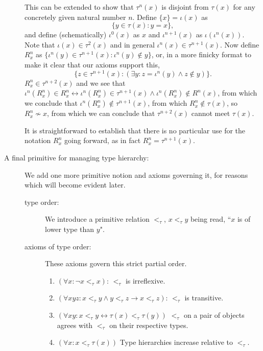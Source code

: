\documentclass[12pt]{article}
\begin{document}
\begin{description}
This can be extended to show that $\tau^n(x)$ is disjoint from $\tau(x)$ for any concretely given natural number $n$.
Define $\{x\} = \iota(x)$ as $$\{y \in \tau(x):y=x\},$$ and define (schematically) $\iota^0(x)$ as $x$ and $\iota^{n+1}(x)$ as $\iota(\iota^n(x))$.  Note that $\iota(x) \in \tau^2(x)$ and in general $\iota^n(x) \in \tau^{n+1}(x)$.  Now define $R^n_x$ as $\{\iota^n(y) \in \tau^{n+1}(x):\iota^n(y) \not\in y\}$, or, in a more finicky format to make it clear that our axioms support this,  $$\{z\in \tau^{n+1}(x):(\exists y: z=\iota^n(y)\wedge z \not\in y)\}.$$ $R^n_x \in \tau^{n+2}(x)$
and we see that $\iota^n(R^n_x) \in R^n_x \leftrightarrow \iota^n(R^n_x) \in \tau^{n+1}(x) \wedge \iota^n(R^n_x) \not\in R^n(x)$, from which we conclude that $\iota^n(R^n_x) \not\in \tau^{n+1}(x)$, from which $R^n_x \not\in \tau(x)$, so $R^n_x \not\sim x$, from which we can conclude that $\tau^{n+2}(x)$ cannot meet $\tau(x)$.

It is straightforward to establish that there is no particular use for the notation $R^n_x$ going forward, as in fact $R^n_x = \tau^{n+1}(x)$.


\item[A final primitive for managing type hierarchy:]  We add one more primitive notion and axioms governing it, for reasons which will become evident later.

\begin{description}

\item[type order:]  We introduce a primitive relation $<_\tau$, $x <_\tau y$ being read, ``$x$ is of lower type than $y$".

\item[axioms of type order:]

These axioms govern this strict partial order.

\begin{enumerate}


\item $(\forall x:\neg x <_\tau x)$:  $<_\tau$ is irreflexive.

\item $(\forall xyz:x<_\tau y \wedge y <_\tau z \rightarrow x <_\tau z)$:  $<_\tau$ is transitive.

\item $(\forall xy: x <_\tau y \leftrightarrow \tau(x) <_\tau \tau(y))$  $<_\tau$ on a pair of objects agrees with $<_\tau$ on their respective types.

\item $(\forall x:x <_\tau \tau(x))$  Type hierarchies increase relative to $<_\tau$.


\end{enumerate}
\end{description}
\end{description}
\end{document}

